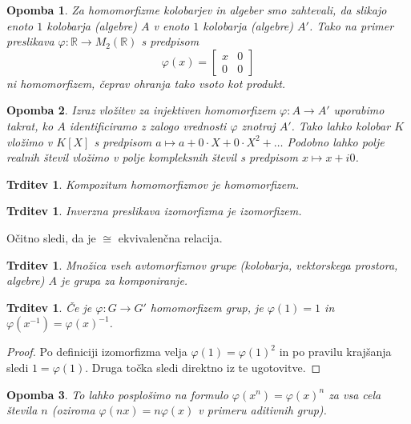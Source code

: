 \documentclass[10pt, a4paper]{article}
\newtheorem{trditev}[izr]{Trditev}
\newtheorem*{opomba}{Opomba}
\newenvironment{noticeC}{%
  \tcolorbox[%
  notitle,
  empty,
  enhanced,  %
  breakable,
  coltext=black, 
  fontupper=\rmfamily,
  parbox=false,
  noparskip,
  sharp corners,
  boxrule=-1pt,  %
  frame hidden,
  left=7pt,  %
  right=7pt,
  top=5pt,
  bottom=5pt,
  before skip=2.5ex plus 2pt,
  after skip=2.5ex plus 2pt,
  overlay unbroken and last={%
  },
  ]}
{\endtcolorbox}
\newenvironment{dokaz}%
  {\begin{noticeC}\begin{proof}}%
  {\end{proof}\end{noticeC}}
\newcommand{\R}{\mathbb {R}}
\begin{document}
\begin{opomba}
  Za homomorfizme kolobarjev in algeber smo zahtevali, da slikajo enoto $1$ kolobarja (algebre) $A$ 
  v enoto $1$ kolobarja (algebre) $A'$. Tako na primer preslikava $\varphi: \R \to M_2 (\R)$ s predpisom 
  $$\varphi(x) = \begin{bmatrix}
    x & 0\\
    0 & 0
  \end{bmatrix}$$ ni homomorfizem, čeprav ohranja tako vsoto kot produkt.
\end{opomba}

\begin{opomba}
  Izraz vložitev za injektiven homomorfizem $\varphi: A \to A'$ uporabimo takrat, 
  ko $A$ identificiramo z zalogo vrednosti $\varphi$ znotraj $A'$.
  Tako lahko kolobar $K$ vložimo v $K[X]$ s predpisom $a \mapsto a + 0\cdot X + 0 \cdot X^2 + \dots$
  Podobno lahko polje realnih števil vložimo v polje kompleksnih števil s predpisom $x \mapsto x + i0$.
\end{opomba}

\begin{trditev}
  Kompozitum homomorfizmov je homomorfizem.
\end{trditev}

\begin{trditev}
  Inverzna preslikava izomorfizma je izomorfizem.
\end{trditev}

Očitno sledi, da je $\cong$ ekvivalenčna relacija.

\begin{trditev}
  Množica vseh avtomorfizmov grupe (kolobarja, vektorskega prostora, algebre) $A$ je grupa za komponiranje.
\end{trditev}

\begin{trditev}
  Če je $\varphi: G \to G'$ homomorfizem grup, je $\varphi(1) = 1$ in $\varphi(x^{-1}) = \varphi(x)^{-1}$.
\end{trditev}

\begin{dokaz}
  Po definiciji izomorfizma velja $\varphi(1) = \varphi(1)^2$ in po pravilu krajšanja sledi $1 = \varphi(1)$.
  Druga točka sledi direktno iz te ugotovitve.
\end{dokaz}

\begin{opomba}
  To lahko posplošimo na formulo $\varphi(x^n) = \varphi(x)^n$ za vsa cela števila $n$ 
  (oziroma $\varphi(nx) = n \varphi(x)$ v primeru aditivnih grup).
\end{opomba}
\end{document}
